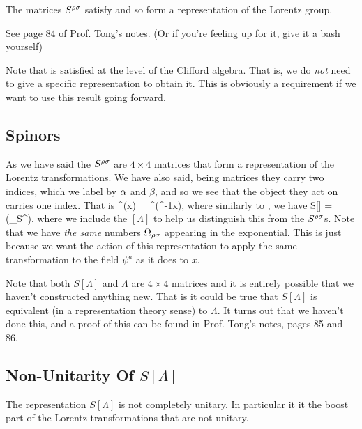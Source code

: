 \bcl 
    The matrices $S^{\rho\sigma}$ satisfy  and so form a representation of the Lorentz group.
\ecl 

\bq 
    See page 84 of Prof. Tong's notes. (Or if you're feeling up for it, give it a bash yourself)
\eq 

\br 
    Note that  is satisfied at the level of the Clifford algebra. That is, we do \textit{not} need to give a specific representation to obtain it. This is obviously a requirement if we want to use this result going forward. 
\er 

\subsection{Spinors}

As we have said the $S^{\rho\sigma}$ are $4\times 4$ matrices that form a representation of the Lorentz transformations. We have also said, being matrices they carry two indices, which we label by $\alpha$ and $\beta$, and so we see that the object they act on carries one index. That is 
\be 
\label{eqn:DiracSpinorLorentzTransformation}
    \psi^{\a}(x) _{\beta} \psi^{\beta}\big(\Lambda^{-1}x\big),
\ee 
where similarly to , we have 
\be  
\label{eqn:SLambdaExp}
    S[\Lambda] = \exp\bigg(\Omega_{\rho\sig}S^{\rho\sig}\bigg),
\ee 
where we include the $[\Lambda]$ to help us distinguish this from the $S^{\rho\sigma}$s. Note that we have \textit{the same} numbers $\Omega_{\rho\sigma}$ appearing in the exponential. This is just because we want the action of this representation to apply the same transformation to the field $\psi^a$ as it does to $x$.

\br 
    Note that both $S[\Lambda]$ and $\Lambda$ are $4\times 4$ matrices and it is entirely possible that we haven't constructed anything new. That is it could be true that $S[\Lambda]$ is equivalent (in a representation theory sense) to $\Lambda$. It turns out that we haven't done this, and a proof of this can be found in Prof. Tong's notes, pages 85 and 86.
\er 

\subsection{Non-Unitarity Of $S[\Lambda]$}

\bcl 
    The representation $S[\Lambda]$ is not completely unitary. In particular it it the boost part of the Lorentz transformations that are not unitary.
\ecl 

